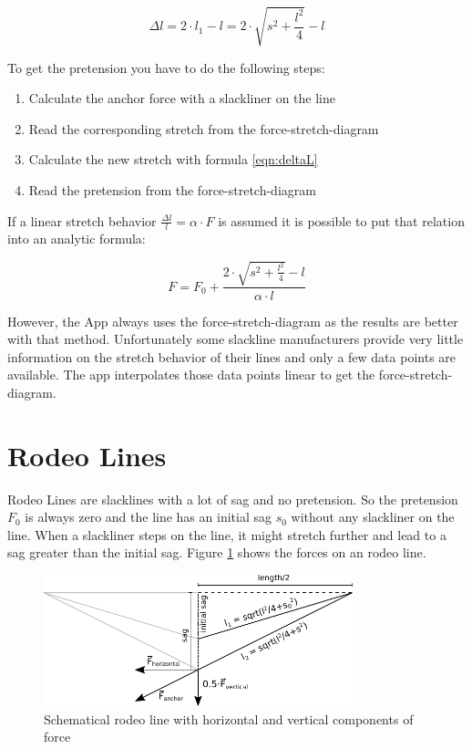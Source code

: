 \begin{equation}
	\Delta l = 2\cdot l_1 - l= 2\cdot \sqrt{s^2+\frac{l^2}{4}} - l
	\label{eqn:deltaL}
\end{equation}

To get the pretension you have to do the following steps:

\begin{enumerate}
	\item Calculate the anchor force with a slackliner on the line
	\item Read the corresponding stretch from the force-stretch-diagram
	\item Calculate the new stretch with formula \ref{eqn:deltaL}
	\item Read the pretension from the force-stretch-diagram
\end{enumerate}

If a linear stretch behavior $\frac{\Delta l}{l} = \alpha\cdot F$ is assumed it is possible to put that relation into an analytic formula:

\begin{equation}
	F = F_0 + \frac{2\cdot \sqrt{s^2+\frac{l^2}{4}} - l}{\alpha\cdot l}
\end{equation}

However, the App always uses the force-stretch-diagram as the results are better with that method.  Unfortunately some slackline manufacturers provide very little information on the stretch behavior of their lines and only a few data points are available. The app interpolates those data points linear to get the force-stretch-diagram.

\section{Rodeo Lines}

Rodeo Lines are slacklines with a lot of sag and no pretension. So the pretension $F_0$ is always zero and the line has an initial sag $s_0$ without any slackliner on the line. When a slackliner steps on the line, it might stretch further and lead to a sag greater than the initial sag. Figure \ref{fig:RodeoLineWithForces} shows the forces on an rodeo line.

\begin{figure}[htb] \centering
	\includegraphics[width=0.8\textwidth]{images/rodeoLineWithForces.pdf}
	\caption{Schematical rodeo line with horizontal and vertical components of force}
	\label{fig:RodeoLineWithForces}
\end{figure}

